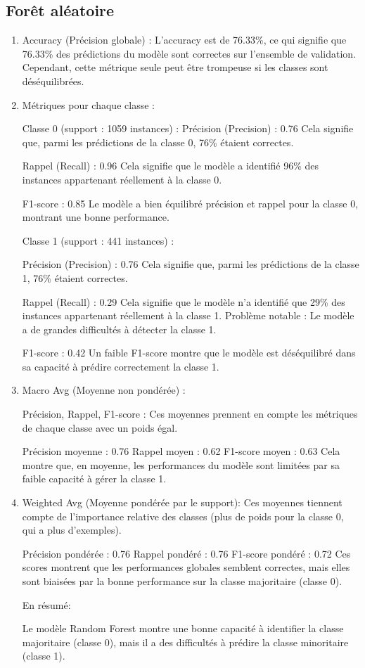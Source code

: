 \subsection{Forêt aléatoire}
\begin{enumerate}

\item Accuracy (Précision globale) :
L'accuracy est de 76.33\%, ce qui signifie que 76.33\% des prédictions du modèle sont correctes sur l'ensemble de validation. Cependant, cette métrique seule peut être trompeuse si les classes sont déséquilibrées.

\item Métriques pour chaque classe :

Classe 0 (support : 1059 instances) :
Précision (Precision) : 0.76
Cela signifie que, parmi les prédictions de la classe 0, 76\% étaient correctes.

Rappel (Recall) : 0.96
Cela signifie que le modèle a identifié 96\% des instances appartenant réellement à la classe 0.

F1-score : 0.85
Le modèle a bien équilibré précision et rappel pour la classe 0, montrant une bonne performance.

Classe 1 (support : 441 instances)  :

Précision (Precision) : 0.76
Cela signifie que, parmi les prédictions de la classe 1, 76\% étaient correctes.

Rappel (Recall) : 0.29
Cela signifie que le modèle n'a identifié que 29\% des instances appartenant réellement à la classe 1.
Problème notable : Le modèle a de grandes difficultés à détecter la classe 1.

F1-score : 0.42
Un faible F1-score montre que le modèle est déséquilibré dans sa capacité à prédire correctement la classe 1.

\item Macro Avg (Moyenne non pondérée) :

Précision, Rappel, F1-score :
Ces moyennes prennent en compte les métriques de chaque classe avec un poids égal.

Précision moyenne : 0.76
Rappel moyen : 0.62
F1-score moyen : 0.63
Cela montre que, en moyenne, les performances du modèle sont limitées par sa faible capacité à gérer la classe 1.


\item Weighted Avg (Moyenne pondérée par le support):
Ces moyennes tiennent compte de l'importance relative des classes (plus de poids pour la classe 0, qui a plus d'exemples).

Précision pondérée : 0.76
Rappel pondéré : 0.76
F1-score pondéré : 0.72
Ces scores montrent que les performances globales semblent correctes, mais elles sont biaisées par la bonne performance sur la classe majoritaire (classe 0).

En résumé:

Le modèle Random Forest montre une bonne capacité à identifier la classe majoritaire (classe 0), mais il a des difficultés à prédire la classe minoritaire (classe 1).
\end{enumerate}

